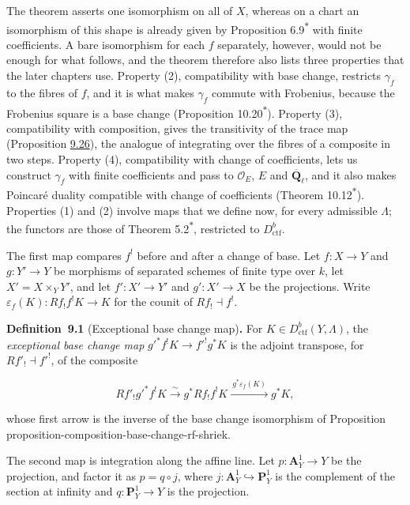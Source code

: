 \documentclass[11pt]{article}
\newenvironment{bpstatement}[2]{\par\addvspace{0.6\baselineskip}\noindent\textbf{#1}#2\textbf{.}\enspace\ignorespaces}
  {\par\addvspace{0.4\baselineskip}}
\newcommand{\bpout}[1]{#1\textsuperscript{\hyperlink{bp-outside}{\ensuremath{\ast}}}}
\begin{document}
The theorem asserts one isomorphism on all of \(X\), whereas on a chart an isomorphism of this shape is already given by Proposition \bpout{6.9} with finite coefficients. A bare isomorphism for each \(f\) separately, however, would not be enough for what follows, and the theorem therefore also lists three properties that the later chapters use. Property (2), compatibility with base change, restricts \(\gamma_f\) to the fibres of \(f\), and it is what makes \(\gamma_f\) commute with Frobenius, because the Frobenius square is a base change (Proposition \bpout{10.20}). Property (3), compatibility with composition, gives the transitivity of the trace map (Proposition \hyperref[bp86]{9.26}), the analogue of integrating over the fibres of a composite in two steps. Property (4), compatibility with change of coefficients, lets us construct \(\gamma_f\) with finite coefficients and pass to \(\mathcal O_E\), \(E\) and \(\overline{\mathbf Q}_\ell\), and it also makes Poincaré duality compatible with change of coefficients (Theorem \bpout{10.12}). Properties (1) and (2) involve maps that we define now, for every admissible \(\Lambda\); the functors are those of Theorem \bpout{5.2}, restricted to \(D^b_{\mathrm{ctf}}\).

The first map compares \(f^!\) before and after a change of base. Let \(f:X\to Y\) and \(g:Y'\to Y\) be morphisms of separated schemes of finite type over \(k\), let \(X'=X\times_YY'\), and let \(f':X'\to Y'\) and \(g':X'\to X\) be the projections. Write \(\varepsilon_f(K):Rf_!f^!K\to K\) for the counit of \(Rf_!\dashv f^!\).

\label{bp5}%
\begin{bpstatement}{Definition~9.1}{ (Exceptional base change map)}
For \(K\in D^b_{\mathrm{ctf}}(Y,\Lambda)\), the \emph{exceptional base change map} \(g'^*f^!K\to f'^!g^*K\) is the adjoint transpose, for \(Rf'_!\dashv f'^!\), of the composite

\[
Rf'_!g'^*f^!K\xrightarrow{\sim}g^*Rf_!f^!K
\xrightarrow{\ g^*\varepsilon_f(K)\ }g^*K,
\]

whose first arrow is the inverse of the base change isomorphism of Proposition proposition-composition-base-change-rf-shriek.
\end{bpstatement}

\label{bp6}%
The second map is integration along the affine line. Let \(p:\mathbf A^1_Y\to Y\) be the projection, and factor it as \(p=q\circ j\), where \(j:\mathbf A^1_Y\hookrightarrow\mathbf P^1_Y\) is the complement of the section at infinity and \(q:\mathbf P^1_Y\to Y\) is the projection.
\end{document}
